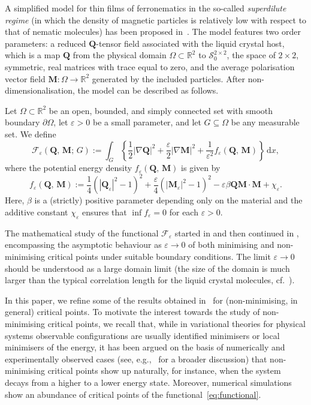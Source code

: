 \documentclass[a4paper, 11pt, twoside, leqno]{article}
\theoremstyle{definition}              %
\theoremstyle{remark}                  %
\newcommand{\abs}[1]{\left| #1 \right|}                             %
\renewcommand{\d}{\mathrm{d}}
\newcommand{\R}{\mathbb{R}}
\newcommand{\Q}{\mathbf{Q}}
\newcommand{\M}{\mathbf{M}}
\newcommand{\F}{\mathscr{F}}
\newcommand{\eps}{\varepsilon}
\newcommand{\Sz}{\mathscr{S}_0^{2\times 2}}
\begin{document}
A simplified model for thin films of ferronematics in the so-called 
\emph{superdilute regime} (in which the density of magnetic particles 
is relatively low with respect to that of nematic molecules)
has been proposed in~\cite{Bisht2019}. The model features 
two order parameters: a reduced $\Q$-tensor field associated with the liquid crystal host, 
which is a map $\Q$ from the physical domain $\Omega \subset \R^2$ to $\Sz$, 
the space of $2 \times 2$, symmetric, real matrices with trace equal to zero,  
and the average polarisation vector field $\M : \Omega \to \R^2$ 
generated by the included particles. After non-dimensionalisation, the model can be described as follows.

Let $\Omega \subset \R^2$ be an open, bounded, and simply connected set with smooth boundary $\partial \Omega$, let $\eps > 0$ be a small parameter, and let 
$G \subseteq \Omega$ be any measurable set. We define
\begin{equation}\label{eq:functional}
    \F_\eps(\Q,\,\M;\,G) := \int_G \left\{ \frac{1}{2} \abs{\nabla \Q}^2 + \frac{\eps}{2} \abs{\nabla \M}^2 + \frac{1}{\eps^2} f_\eps(\Q,\,\M)\right\} \,{\d}x,
\end{equation}
where the potential energy density $f_\eps(\Q,\,\M)$ is given by
\begin{equation}\label{eq:f}
    f_\eps(\Q,\,\M) := \frac{1}{4}\left( \abs{\Q_\eps}^2 - 1 \right)^2 + \frac{\eps}{4}\left( \abs{\M_\eps}^2 - 1 \right)^2 - \eps \beta \Q \M \cdot \M + \chi_\eps.
\end{equation}
Here, $\beta$ is a (strictly) positive parameter depending only on the material and the additive constant $\chi_\eps$ ensures that $\inf f_\eps = 0$ for each $\eps > 0$. 

The mathematical study of the functional $\F_\eps$ 
started in \cite{CMSW} and then continued in \cite{CDS1, CDS2, CDS3}, 
encompassing the asymptotic behaviour as $\eps \to 0$ 
of both 
minimising and non-minimising critical points under suitable boundary conditions. 
The limit $\eps \to 0$ should be understood as a large domain limit 
(the size of the domain is much larger than the typical correlation length for 
the liquid crystal molecules, cf.~\cite{CMSW,CDS1}).

In this paper, we refine some of the results obtained in~\cite{CDS1,CDS2} 
for (non-minimising, in general) critical points. 
To motivate the interest towards the study of non-minimising critical points, we 
recall that, while in variational theories for physical systems observable configurations are usually identified minimisers or local minimisers 
of the energy, 
it has been argued on the basis of numerically and experimentally observed cases 
(see, e.g.,~\cite{GurtinMatano} for a broader discussion) that non-minimising critical 
points show up naturally, for instance, when the system decays from a higher to a lower energy state. 
Moreover, numerical simulations~\cite{Bisht2019,CMSW} show an abundance of critical points of the functional~\eqref{eq:functional}.
\end{document}
